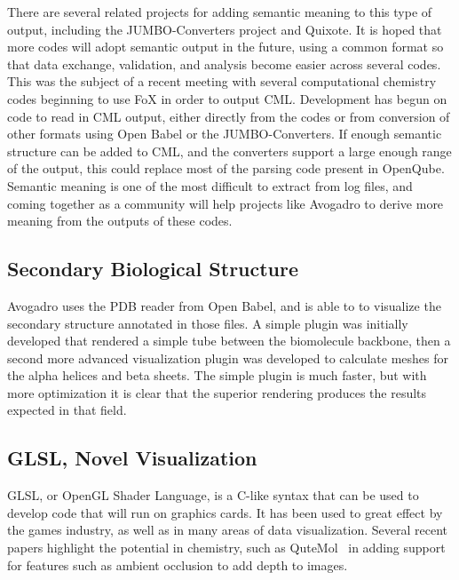 \documentclass[10pt]{bmc_article}
\newenvironment{bmcformat}{\begin{raggedright}
\baselineskip20pt\sloppy\setboolean{publ}{false}}{\end{raggedright}
\baselineskip20pt\sloppy}
\begin{document}
\begin{bmcformat}
There are several related projects for adding semantic meaning to this type of output,
including the JUMBO-Converters project and Quixote. It is hoped that more codes
will adopt semantic output in the future, using a common format so that data exchange,
validation, and analysis become easier across several codes. This was the subject of
a recent meeting with several computational chemistry codes beginning to use FoX
in order to output CML. Development has begun on code to read in CML output,
either directly from the codes or from conversion of other formats using Open Babel
or the JUMBO-Converters. If enough semantic structure can be added to CML, and the
converters support a large enough range of the output, this could replace most of
the parsing code present in OpenQube. Semantic meaning is one of the most
difficult to extract from log files, and coming together as a community will help
projects like Avogadro to derive more meaning from the outputs of these codes.

\subsection{Secondary Biological Structure}

Avogadro uses the PDB reader from Open Babel, and is able to to visualize the
secondary structure annotated in those files. A simple plugin was initially
developed that rendered a simple tube between the biomolecule backbone, then a
second more advanced visualization plugin was developed to calculate meshes for
the alpha helices and beta sheets. The simple plugin is much faster, but with
more optimization it is clear that the superior rendering produces the results
expected in that field.

\subsection{GLSL, Novel Visualization}

GLSL, or OpenGL Shader Language, is a C-like syntax that can be used to develop
code that will run on graphics cards. It has been used to great effect by the
games industry, as well as in many areas of data visualization. Several recent
papers highlight the potential in chemistry, such as QuteMol~\cite{QuteMol} in
adding support for features such as ambient occlusion to add depth to images.


\end{bmcformat}
\end{document}
